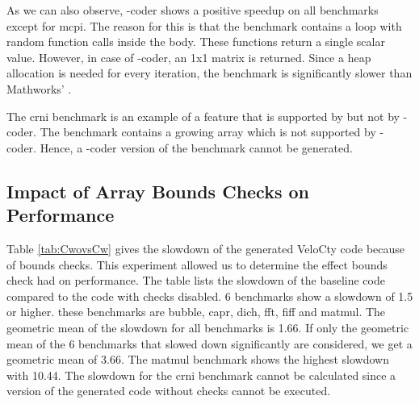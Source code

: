 As we can also observe, \matlab-coder shows a positive speedup on all benchmarks except for \textsf{mcpi}. The reason for this is that the benchmark contains a loop with random function calls inside the body. These functions return a single scalar value. However, in case of \matlab-coder, an 1x1 matrix is returned. Since a heap allocation is needed for every iteration, the benchmark is significantly slower than Mathworks' \matlab. 

The \textsf{crni} benchmark is an example of a feature that is supported by \velocty but not by \matlab-coder. The benchmark contains a growing array which is not supported by \matlab-coder. Hence, a \matlab-coder version of the benchmark cannot be generated. 

\subsection{Impact of Array Bounds Checks on Performance}
Table \ref{tab:CwovsCw} gives the slowdown of the generated VeloCty code because of bounds checks. This experiment allowed us to determine the effect bounds check had on performance. The table lists the slowdown of the baseline \velocty code compared to the \velocty code with checks disabled. 6 benchmarks show a slowdown of 1.5 or higher. these benchmarks are \textsf{bubble}, \textsf{capr}, \textsf{dich}, \textsf{fft}, \textsf{fiff} and \textsf{matmul}. The geometric mean of the slowdown for all benchmarks is 1.66. If only the geometric mean of the  6 benchmarks that slowed down significantly  are considered, we get a geometric mean of 3.66. The matmul benchmark shows the highest slowdown with 10.44. The slowdown for the \textsf{crni} benchmark cannot be calculated since a version of the generated code without checks cannot be executed. 

